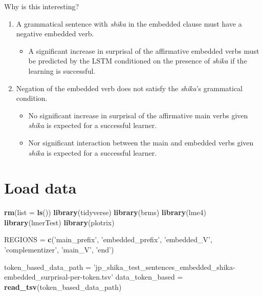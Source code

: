 \documentclass[]{ltjsarticle}
\newenvironment{Shaded}{\begin{snugshade}}{\end{snugshade}}
\newcommand{\KeywordTok}[1]{\textcolor[rgb]{0.13,0.29,0.53}{\textbf{#1}}}
\newcommand{\DataTypeTok}[1]{\textcolor[rgb]{0.13,0.29,0.53}{#1}}
\newcommand{\StringTok}[1]{\textcolor[rgb]{0.31,0.60,0.02}{#1}}
\newcommand{\NormalTok}[1]{#1}
\providecommand{\tightlist}{%
  \setlength{\itemsep}{0pt}\setlength{\parskip}{0pt}}
\begin{document}
Why is this interesting?

\begin{enumerate}
\def\labelenumi{\arabic{enumi}.}
\tightlist
\item
  A grammatical sentence with \emph{shika} in the embedded clause must
  have a negative embedded verb.

  \begin{itemize}
  \tightlist
  \item
    A significant increase in surprisal of the affirmative embedded
    verbs must be predicted by the LSTM conditioned on the presence of
    \emph{shika} if the learning is successful.
  \end{itemize}
\item
  Negation of the embedded verb does not satisfy the \emph{shika}'s
  grammatical condition.

  \begin{itemize}
  \tightlist
  \item
    No significant increase in surprisal of the affirmative main verbs
    given \emph{shika} is expected for a successful learner.
  \item
    Nor significant interaction between the main and embedded verbs
    given \emph{shika} is expected for a successful learner.
  \end{itemize}
\end{enumerate}

\section{Load data}\label{load-data}

\begin{Shaded}
\begin{Highlighting}[]
\KeywordTok{rm}\NormalTok{(}\DataTypeTok{list =} \KeywordTok{ls}\NormalTok{())}
\KeywordTok{library}\NormalTok{(tidyverse)}
\KeywordTok{library}\NormalTok{(brms)}
\KeywordTok{library}\NormalTok{(lme4)}
\KeywordTok{library}\NormalTok{(lmerTest)}
\KeywordTok{library}\NormalTok{(plotrix)}

\NormalTok{REGIONS =}\StringTok{ }\KeywordTok{c}\NormalTok{(}\StringTok{'main_prefix'}\NormalTok{, }\StringTok{'embedded_prefix'}\NormalTok{, }\StringTok{'embedded_V'}\NormalTok{, }\StringTok{'complementizer'}\NormalTok{, }\StringTok{'main_V'}\NormalTok{, }\StringTok{'end'}\NormalTok{)}

\NormalTok{token_based_data_path =}\StringTok{ 'jp_shika_test_sentences_embedded_shika-embedded_surprisal-per-token.tsv'}
\NormalTok{data_token_based =}\StringTok{ }\KeywordTok{read_tsv}\NormalTok{(token_based_data_path)}
\end{Highlighting}
\end{Shaded}
\end{document}
